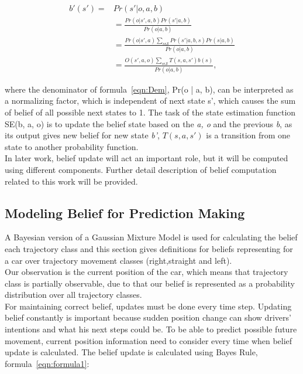 \begin{equation}
\begin{split}
b'(s') = & \displaystyle Pr(s'|o, a, b) \\ 
& = \displaystyle \frac{Pr(o|s', a, b) Pr(s'|a, b)}{Pr(o|a, b)} \\
& = \displaystyle \frac{Pr(o|s', a) \sum_{s \epsilon \mathscr{S}} Pr(s'|a, b, s) Pr(s|a, b)}{Pr(o|a, b)} \\
& = \displaystyle \frac{O(s', a, o) \sum_{s \epsilon \mathscr{S}} T(s, a, s') b(s)}{Pr(o|a, b) }, 
\end{split}
\label{eqn:Dem}
\end{equation}

where the denominator of formula~\ref{eqn:Dem}, Pr(o | a, b), can be interpreted as a normalizing factor, which is independent of next state s', which causes the sum of belief of all possible next states to 1. The task of the state estimation function SE(b, a, o) is to update the belief state based on the \textit{a, o} and the previous \textit{b}, as its output gives new belief for new state \textit{b'}, $T(s, a, s')$ is a transition from one state to another probability function. \\
In later work, belief update will act an important role, but it will be computed using different components. Further detail description of belief computation related to this work will be provided.

\subsection{Modeling Belief for Prediction Making}

A Bayesian version of a Gaussian Mixture Model is used for calculating the belief each trajectory class and this section gives definitions for beliefs representing for a car over trajectory movement classes (right,straight and left). \\
Our observation is the current position of the car, which means that trajectory class is partially observable, due to that our belief is represented as a probability distribution over all trajectory classes. \\
For maintaining correct belief, updates must be done every time step. Updating belief constantly is important because sudden position change can show drivers' intentions and what his next steps could be. To be able to predict possible future movement, current position information need to consider every time when belief update is calculated. The belief update is calculated using Bayes Rule, formula~\ref{eqn:formula1}: 

